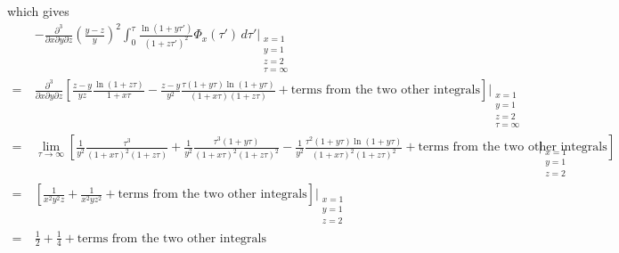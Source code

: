 \documentclass[11pt]{article}
\begin{document}
which gives
\begin{align}
    \quad& -\frac{\partial^3}{\partial x \partial y \partial z} \left(\frac{y-z}{y}\right)^2 \int_0^{\tau} \frac{\ln(1+y\tau')}{(1+z\tau')^2} \Phi_x(\tau') \,d\tau'\Bigg\vert_{\substack{x=1 \\ y=1 \\ z=2 \\ \tau=\infty}} \\\nonumber
    =&{} \frac{\partial^3}{\partial x \partial y \partial  z} \left[\frac{z-y}{yz}\frac{\ln(1+z\tau)}{1+x\tau} - \frac{z-y}{y^2}\frac{\tau(1+y\tau)\ln(1+y\tau)}{(1+x\tau)(1+z\tau)} +\textrm{terms from the two other integrals}\right]\Bigg\vert_{\substack{x=1 \\ y=1 \\ z=2 \\ \tau=\infty}} \\\nonumber
    =&{} \lim_{\tau\to\infty} \left[\frac{1}{y^2}\frac{\tau^3}{(1+x\tau)^2(1+z\tau)} + \frac{1}{y^2}\frac{\tau^3(1+y\tau)}{(1+x\tau)^2(1+z\tau)^2}
    - \frac{1}{y^2}\frac{\tau^2(1+y\tau)\ln(1+y\tau)}{(1+x\tau)^2(1+z\tau)^2}+\textrm{terms from the two other integrals}\right]\Bigg\vert_{\substack{x=1 \\ y=1 \\ z=2}} \\\nonumber
    =&{}\left[\frac{1}{x^2y^2z}+\frac{1}{x^2yz^2}+\textrm{terms from the two other integrals}\right]\Bigg\vert_{\substack{x=1 \\ y=1 \\ z=2}} \\\nonumber
    =&{}\frac{1}{2}+\frac{1}{4}+\textrm{terms from the two other integrals}
\end{align}
\end{document}
